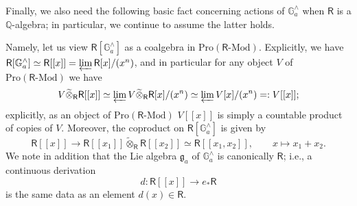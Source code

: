 \documentclass{amsart}
\theoremstyle{definition}
\newcommand{\Pro}{\on{Pro}}
\newcommand{\sss}{\subsubsection{}}
\newcommand{\Sing}{\mathsf{S}}
\renewcommand{\mod}{\text{-}\on{Mod}}
\newcommand{\on}{\mathrm}
\newcommand{\Ring}{\mathsf{R}}
\numberwithin{equation}{section}
\begin{document}
 %

\sss{} Finally, we also need the following basic fact concerning actions of $\mathbb{G}_a^\wedge$ when $\Ring$ is a $\mathbb{Q}$-algebra; in particular, we continue to assume the latter holds. 

Namely, let us view $\Ring[\mathbb{G}_a^\wedge]$ as a coalgebra in $\Pro(\Ring\mod)$. Explicitly, we have $\Ring[\mathbb{G}_a^\wedge] \simeq \Ring[[x]] = \varprojlim \Ring[x]/(x^n)$, and in particular for any object $V$ of $\Pro(\Ring\mod)$ we have 
$$V \widetilde{\otimes}_\Ring \Ring[[x]] \simeq \varprojlim V \widetilde{\otimes}_\Ring \Ring[x]/(x^n) \simeq \varprojlim V[x]/(x^n) =: V[[x]];$$
explicitly, as an object of $\Pro(\Ring\mod)$ $V[[x]]$ is simply a countable product of copies of $V$. Moreover, the coproduct on $\Ring[\mathbb{G}_a^\wedge]$ is given by 
$$\Ring[[x]] \rightarrow \Ring[[x_1]] \widetilde{\otimes}_\Ring \Ring[[x_2]] \simeq \Ring[[x_1, x_2]], \quad \quad x \mapsto x_1 + x_2.$$
We note in addition that the Lie algebra $\mathfrak{g}_a$ of $\mathbb{G}_a^\wedge$ is canonically $\Ring$; i.e., a continuous derivation $$d: \Ring[[x]] \rightarrow e_* \Ring$$is the same data as an element $d(x) \in \Ring$. 
\end{document}
